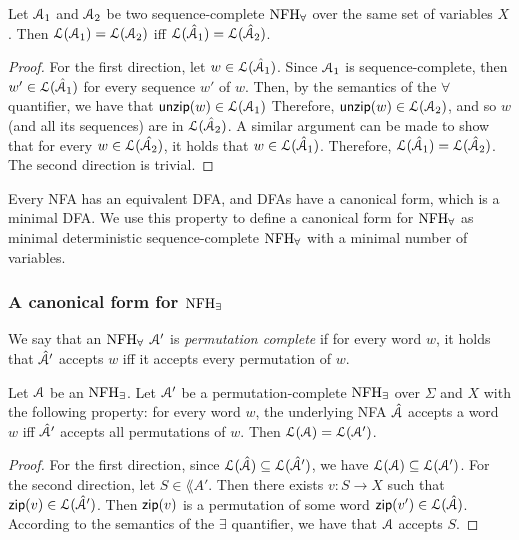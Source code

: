 \begin{lemma}
Let $\mathcal{A}_1$ and $\mathcal{A}_2$ be two sequence-complete $\textrm{NFH}_{\forall}$ over the same set of variables $X$.
Then $\mathcal{L}(\mathcal{A}_1)=\mathcal{L}(\mathcal{A}_2)$ iff  $\mathcal{L}(\hat{\mathcal{A}}_1) = \mathcal{L}(\hat {\mathcal{A}}_2)$.
\end{lemma}
\begin{proof}
For the first direction, let $w\in\mathcal{L}(\hat{\mathcal{A}}_1)$.
Since $\mathcal{A}_1$ is sequence-complete, then $w'\in\mathcal{L}(\hat{\mathcal{A}}_1)$ for every sequence $w'$ of $w$. Then, by the semantics of the $\forall$ quantifier, we have that $\mathsf{unzip}(w)\in\mathcal{L}(\mathcal{A}_1)$ Therefore, $\mathsf{unzip}(w)\in\mathcal{L}(\mathcal{A}_2)$, and so $w$ (and all its sequences) are in $\mathcal{L}(\hat{\mathcal{A}}_2)$. A similar argument can be made to show that for every $w\in\mathcal{L}(\hat{\mathcal{A}_2})$, it holds that $w\in\mathcal{L}(\hat{\mathcal{A}}_1)$. Therefore, $\mathcal{L}(\hat{\mathcal{A}}_1) = \mathcal{L}(\hat {\mathcal{A}}_2)$.
The second direction is trivial.
\end{proof}

Every NFA has an equivalent DFA, and DFAs have a canonical form, which is a minimal DFA. We use this property to define a canonical form for $\textrm{NFH}_{\forall}$ as minimal deterministic sequence-complete $\textrm{NFH}_{\forall}$ with a minimal number of variables. 


\subsubsection{A canonical form for $\textrm{NFH}_{\exists}$}

We say that an $\textrm{NFH}_{\forall}$ $\mathcal{A}'$ is {\em permutation complete} if for every word $w$, it holds that $\hat {\mathcal{A}}'$ accepts $w$ iff it accepts every permutation of $w$. 

\begin{lemma}
Let $\mathcal{A}$ be an $\textrm{NFH}_{\exists}$.
Let $\mathcal{A}'$ be a permutation-complete $\textrm{NFH}_{\exists}$ over $\Sigma$ and $X$ with the following property: for every word $w$, the underlying NFA $\hat{\mathcal{A}}$ accepts a word $w$ iff $\hat{\mathcal{A}}'$ accepts all permutations of $w$. %
Then $\mathcal{L}(\mathcal{A}) =\mathcal{L}(\mathcal{A}')$.
\end{lemma}
\begin{proof}
For the first direction, since $\mathcal{L}(\hat{\mathcal{A}})\subseteq \mathcal{L}(\hat{\mathcal{A}}')$, we have $\mathcal{L}(\mathcal{A})\subseteq \mathcal{L}(\mathcal{A}')$.
For the second direction, let 
$S\in\lang{A'}$. Then there exists $v:S\rightarrow X$ such that $\mathsf{zip}(v)\in\mathcal{L}(\hat{\mathcal{A}}')$. Then
$\mathsf{zip}(v)$ is a permutation of some word $\mathsf{zip}(v')\in\mathcal{L}(\hat{\mathcal{A}})$.  
According to the semantics of the $\exists$ quantifier, we have that $\mathcal{A}$ accepts $S$. 
\end{proof}

